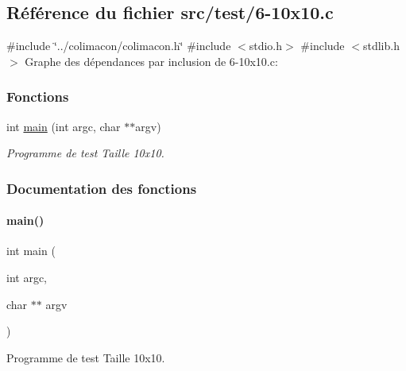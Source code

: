 \hypertarget{6-10x10_8c}{}\subsection{Référence du fichier src/test/6-\/10x10.c}
\label{6-10x10_8c}
{\ttfamily \#include \char`\"{}../colimacon/colimacon.\+h\char`\"{}}\newline
{\ttfamily \#include $<$stdio.\+h$>$}\newline
{\ttfamily \#include $<$stdlib.\+h$>$}\newline
Graphe des dépendances par inclusion de 6-\/10x10.c\+:
\subsubsection*{Fonctions}
\begin{DoxyCompactItemize}
\item 
int \hyperlink{6-10x10_8c_a3c04138a5bfe5d72780bb7e82a18e627}{main} (int argc, char $\ast$$\ast$argv)
\begin{DoxyCompactList}\small\item\em Programme de test Taille 10x10. \end{DoxyCompactList}\end{DoxyCompactItemize}


\subsubsection{Documentation des fonctions}
\mbox{\label{6-10x10_8c_a3c04138a5bfe5d72780bb7e82a18e627}} 
\paragraph{\texorpdfstring{main()}{main()}}
{\footnotesize\ttfamily int main (\begin{DoxyParamCaption}\item[{int}]{argc,  }\item[{char $\ast$$\ast$}]{argv }\end{DoxyParamCaption})}



Programme de test Taille 10x10. 

